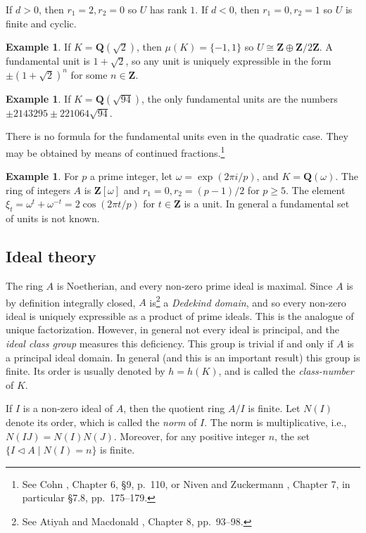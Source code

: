 \documentclass[10pt,leqno]{article}
\theoremstyle{definition}
\newtheorem{exam}[theo]{Example}
\def\ZZ{\mathbf{Z}}
\def\QQ{\mathbf{Q}}
\newcommand{\tri}{\mathbin{\triangleleft}}
\def\fnonfi{See Cohn \cite{bib:36}, Chapter 6, \S9, p.~110, or Niven and Zuckermann \cite{bib:148}, Chapter 7, in particular \S7.8, pp.~175--179.}
\def\fnonsi{See Atiyah and Macdonald \cite{bib:17}, Chapter 8, pp.~93--98.}
\begin{document}
If $d > 0$, then $r_1 = 2, r_2 = 0$ so $U$ has rank $1$.
If $d < 0$, then $r_1 = 0, r_2 = 1$ so $U$ is finite and cyclic.


\begin{exam}
\label{2.1.2}
If $K = \QQ(\sqrt 2)$, then $\mu(K) = \{-1,1\}$ so $U \cong \ZZ \oplus \ZZ / 2 \ZZ$.
A fundamental unit is $1 + \sqrt 2$, so any unit is uniquely expressible in the form $\pm(1 + \sqrt 2)^n$ for some $n \in \ZZ$.
\end{exam}


\begin{exam}
\label{2.1.3}
If $K = \QQ(\sqrt{94})$, the only fundamental units are the numbers $\pm 2143295 \pm 221064 \sqrt{94}$.
\end{exam}

There is no formula for the fundamental units even in the quadratic case.
They may be obtained by means of continued fractions.\footnote{\fnonfi}


\begin{exam}
For $p$ a prime integer, let $\omega = \exp(2 \pi i / p)$, and $K = \QQ(\omega)$.
The ring of integers $A$ is $\ZZ[\omega]$ and $r_1 = 0, r_2 = (p-1)/2$ for $p \geq 5$.
The element $\xi_t = \omega^t + \omega^{-t} = 2\cos(2 \pi t / p)$ for $t \in \ZZ$ is a unit.
In general a fundamental set of units is not known.
\end{exam}


\subsection{Ideal theory}
\label{ch:2.2}

The ring $A$ is Noetherian, and every non-zero prime ideal is maximal.
Since $A$ is by definition integrally closed, $A$ is\footnote{\fnonsi} a \emph{Dedekind domain}, and so every non-zero ideal is uniquely expressible as a product of prime ideals.
This is the analogue of unique factorization.
However, in general not every ideal is principal, and the \emph{ideal class group} measures this deficiency.
This group is trivial if and only if $A$ is a principal ideal domain.
In general (and this is an important result) this group is finite.
Its order is usually denoted by $h = h(K)$, and is called the \emph{class-number} of $K$.

If $I$ is a non-zero ideal of $A$, then the quotient ring $A / I$ is finite.
Let $N(I)$ denote its order, which is called the \emph{norm} of $I$.
The norm is multiplicative, i.e., $N(IJ) = N(I) N(J)$.
Moreover, for any positive integer $n$, the set $\{ I \tri A \mid N(I) = n\}$ is finite.
\end{document}
